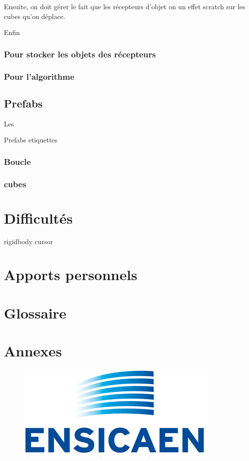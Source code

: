 \documentclass[a4paper,11pt]{myreport}
\begin{document}
	\par Ensuite, on doit gérer le fait que les récepteurs d'objet on un effet scratch sur les cubes qu'on déplace.
	
	\par Enfin
	\subsection{Pour stocker les objets des récepteurs}
	\subsection{Pour l'algorithme}
	
	\section{Prefabs}
	\hypertarget{prefabTarget}{Les} Prefabs
	etiquettes
	\subsection{Boucle}
	\subsection{cubes}

\chapter{Difficultés}
rigidbody
cursor
\chapter{Apports personnels}

\chapter{Glossaire}

\chapter{Annexes}

\begin{figure}[h]
	\includegraphics[scale=0.70]{./images/LogoEnsicaenSansTexte.jpg}
\end{figure}
\listoffigures
\end{document}

